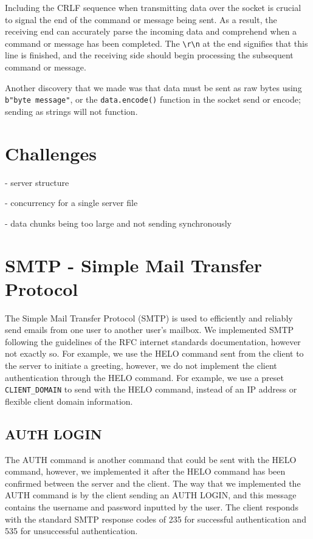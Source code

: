 \documentclass[12pt]{article}
\begin{document}
Including the CRLF sequence when transmitting data over the socket is crucial to signal the end of the command or message being sent. As a result, the receiving end can accurately parse the incoming data and comprehend when a command or message has been completed. The \texttt{\textbackslash r\textbackslash n} at the end signifies that this line is finished, and the receiving side should begin processing the subsequent command or message.

Another discovery that we made was that data must be sent as raw bytes using \texttt{b"byte message"}, or the \texttt{data.encode()} function in the socket send or encode; sending as strings will not function. 

\section{Challenges}
- server structure

- concurrency for a single server file

- data chunks being too large and not sending synchronously

\section{SMTP - Simple Mail Transfer Protocol}
The Simple Mail Transfer Protocol (SMTP) is used to efficiently and reliably send emails from one user to another user's mailbox. We implemented SMTP following the guidelines of the RFC internet standards documentation, however not exactly so. For example, we use the HELO command sent from the client to the server to initiate a greeting, however, we do not implement the client authentication through the HELO command. For example, we use a preset \texttt{CLIENT\_DOMAIN} to send with the HELO command, instead of an IP address or flexible client domain information. 

\subsection{AUTH LOGIN}

The AUTH command is another command that could be sent with the HELO command, however, we implemented it after the HELO command has been confirmed between the server and the client. The way that we implemented the AUTH command is by the client sending an AUTH LOGIN, and this message contains the username and password inputted by the user. The client responds with the standard SMTP response codes of 235 for successful authentication and 535 for unsuccessful authentication. 
\end{document}
